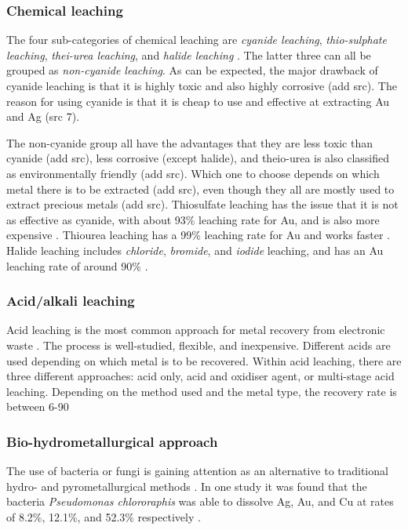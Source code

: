 \subsubsection{Chemical leaching}

The four sub-categories of chemical leaching are \textit{cyanide leaching}, \textit{thio-sulphate leaching}, \textit{thei-urea leaching}, and \textit{halide leaching} \cite{javed2024}. The latter three can all be grouped as \textit{non-cyanide leaching}. As can be expected, the major drawback of cyanide leaching is that it is highly toxic and also highly corrosive (add src). The reason for using cyanide is that it is cheap to use and effective at extracting Au and Ag (src 7).

The non-cyanide group all have the advantages that they are less toxic than cyanide (add src), less corrosive (except halide), and theio-urea is also classified as environmentally friendly (add src). Which one to choose depends on which metal there is to be extracted (add src), even though they all are mostly used to extract precious metals (add src). Thiosulfate leaching has the issue that it is not as effective as cyanide, with about 93\% leaching rate for Au, and is also more expensive \cite{javed2024}. Thiourea leaching has a 99\% leaching rate for Au and works faster \cite{javed2024}. Halide leaching includes \textit{chloride}, \textit{bromide}, and \textit{iodide} leaching, and has an Au leaching rate of around 90\% \cite{javed2024}.

\subsubsection{Acid/alkali leaching}

Acid leaching is the most common approach for metal recovery from electronic waste \cite{javed2024}. The process is well-studied, flexible, and inexpensive. Different acids are used depending on which metal is to be recovered. Within acid leaching, there are three different approaches: acid only, acid and oxidiser agent, or multi-stage acid leaching. Depending on the method used and the metal type, the recovery rate is between 6-90%

\subsubsection{Bio-hydrometallurgical approach}

The use of bacteria or fungi is gaining attention as an alternative to traditional hydro- and pyrometallurgical methods \cite{javed2024}. In one study it was found that the bacteria \textit{Pseudomonas chlororaphis} was able to dissolve Ag, Au, and Cu at rates of 8.2\%, 12.1\%, and 52.3\% respectively \cite{bioleaching}. 

